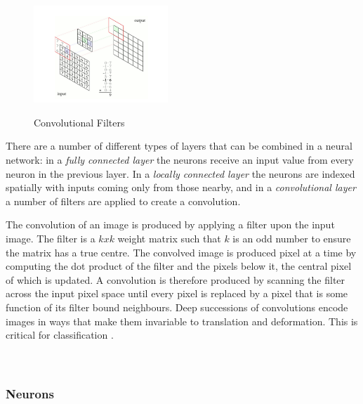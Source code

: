 \documentclass[a4paper,11pt,titlepage]{article}
\begin{document}
		\begin{figure}[H]
    			\centering	
    			{{\includegraphics[width=0.45\textwidth]
    				{img/convolutional_network.png} 
    			}}%
    			\caption{Convolutional Filters}%
    			\label{fig:convfilters}
		\end{figure}		

		\par 
		There are a number of different types of layers that can be combined in a neural network: in a \textit{fully connected layer} the neurons receive an input value from every neuron in the previous layer. In a \textit{locally connected layer} the neurons are indexed spatially with inputs coming only from those nearby, and in a \textit{convolutional layer} a number of filters are applied to create a convolution. 
		\par
		The convolution of an image is produced by applying a filter upon the input image. The filter is a $k x k$ weight matrix such that $ k $ is an odd number to ensure the matrix has a true centre. The convolved image is produced pixel at a time by computing the dot product of the filter and the pixels below it, the central pixel of which is updated. A convolution is therefore produced by scanning the filter across the input pixel space until every pixel is replaced by a pixel that is some function of its filter bound neighbours. Deep successions of convolutions encode images in ways that make them invariable to translation and deformation. This is critical for classification \cite{Bruna2012}.
\\\
\\\

\subsubsection{Neurons}
		
		\begin{figure}[H]
    			\centering	
    			\qquad
    			\caption{}%
    			\label{fig:biologicalNeurons}
		\end{figure}
				
\end{document}
